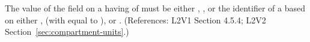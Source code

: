 The value of the  field on a \Compartment having
 of  must be either ,
, or the identifier of a \UnitDefinition based on either
,  (with  equal to ), or
.  (References: L2V1 Section 4.5.4; L2V2
Section~\ref{sec:compartment-units}.)
